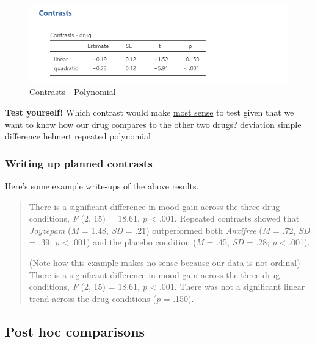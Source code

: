 \documentclass[
]{book}
\begin{document}
\begin{figure}

{\centering \includegraphics[width=1\linewidth]{images/04_one-way-anova/contrasts_polynomial} 

}

\caption{Contrasts - Polynomial}\label{fig:unnamed-chunk-14}
\end{figure}

\textbf{Test yourself!} Which contrast would make \underline{most sense} to test given that we want to know how our drug compares to the other two drugs? deviation simple difference helmert repeated polynomial

\hypertarget{writing-up-planned-contrasts}{%
\subsubsection{Writing up planned contrasts}\label{writing-up-planned-contrasts}}

Here's some example write-ups of the above results.

\begin{quote}
There is a significant difference in mood gain across the three drug conditions, \emph{F} (2, 15) = 18.61, \emph{p} \textless{} .001. Repeated contrasts showed that \emph{Joyzepam} (\emph{M} = 1.48, \emph{SD} = .21) outperformed both \emph{Anxifree} (\emph{M} = .72, \emph{SD} = .39; \emph{p} \textless{} .001) and the placebo condition (\emph{M} = .45, \emph{SD} = .28; \emph{p} \textless{} .001).

(Note how this example makes no sense because our data is not ordinal) There is a significant difference in mood gain across the three drug conditions, \emph{F} (2, 15) = 18.61, \emph{p} \textless{} .001. There was not a significant linear trend across the drug conditions (\emph{p} = .150).
\end{quote}

\hypertarget{post-hoc-comparisons}{%
\subsection{Post hoc comparisons}\label{post-hoc-comparisons}}
\end{document}
